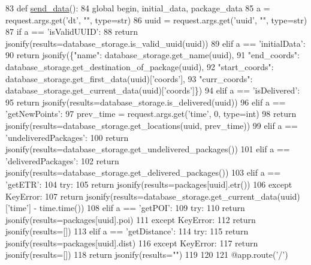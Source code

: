 \begin{DoxyCode}
83 \textcolor{keyword}{def }\hyperlink{namespacerun_aeefb6baadf72429a8685237fc18b7756}{send\_data}():
84     \textcolor{keyword}{global} begin, initial\_data, package\_data
85     a = request.args.get(\textcolor{stringliteral}{'dt'}, \textcolor{stringliteral}{""}, type=str)
86     uuid = request.args.get(\textcolor{stringliteral}{'uuid'}, \textcolor{stringliteral}{""}, type=str)
87     \textcolor{keywordflow}{if} a == \textcolor{stringliteral}{'isValidUUID'}:
88         \textcolor{keywordflow}{return} jsonify(results=database\_storage.is\_valid\_uuid(uuid))
89     \textcolor{keywordflow}{elif} a == \textcolor{stringliteral}{'initialData'}:
90         \textcolor{keywordflow}{return} jsonify(\{\textcolor{stringliteral}{"name"}: database\_storage.get\_name(uuid),
91                         \textcolor{stringliteral}{"end\_coords"}: database\_storage.get\_destination\_of\_package(uuid),
92                         \textcolor{stringliteral}{"start\_coords"}: database\_storage.get\_first\_data(uuid)[\textcolor{stringliteral}{'coords'}],
93                         \textcolor{stringliteral}{"curr\_coords"}: database\_storage.get\_current\_data(uuid)[\textcolor{stringliteral}{'coords'}]\})
94     \textcolor{keywordflow}{elif} a == \textcolor{stringliteral}{'isDelivered'}:
95         \textcolor{keywordflow}{return} jsonify(results=database\_storage.is\_delivered(uuid))
96     \textcolor{keywordflow}{elif} a == \textcolor{stringliteral}{'getNewPoints'}:
97         prev\_time = request.args.get(\textcolor{stringliteral}{'time'}, 0, type=int)
98         \textcolor{keywordflow}{return} jsonify(results=database\_storage.get\_locations(uuid, prev\_time))
99     \textcolor{keywordflow}{elif} a == \textcolor{stringliteral}{'undeliveredPackages'}:
100         \textcolor{keywordflow}{return} jsonify(results=database\_storage.get\_undelivered\_packages())
101     \textcolor{keywordflow}{elif} a == \textcolor{stringliteral}{'deliveredPackages'}:
102         \textcolor{keywordflow}{return} jsonify(results=database\_storage.get\_delivered\_packages())
103     \textcolor{keywordflow}{elif} a == \textcolor{stringliteral}{'getETR'}:
104         \textcolor{keywordflow}{try}:
105             \textcolor{keywordflow}{return} jsonify(results=packages[uuid].etr())
106         \textcolor{keywordflow}{except} KeyError:
107             \textcolor{keywordflow}{return} jsonify(results=database\_storage.get\_current\_data(uuid)[\textcolor{stringliteral}{'time'}] - time.time())
108     \textcolor{keywordflow}{elif} a == \textcolor{stringliteral}{'getPOI'}:
109         \textcolor{keywordflow}{try}:
110             \textcolor{keywordflow}{return} jsonify(results=packages[uuid].poi)
111         \textcolor{keywordflow}{except} KeyError:
112             \textcolor{keywordflow}{return} jsonify(results=[])
113     \textcolor{keywordflow}{elif} a == \textcolor{stringliteral}{'getDistance'}:
114         \textcolor{keywordflow}{try}:
115             \textcolor{keywordflow}{return} jsonify(results=packages[uuid].dist)
116         \textcolor{keywordflow}{except} KeyError:
117             \textcolor{keywordflow}{return} jsonify(results=[])
118     \textcolor{keywordflow}{return} jsonify(results=\textcolor{stringliteral}{""})
119 
120 
121 @app.route(\textcolor{stringliteral}{'/'})
\end{DoxyCode}
